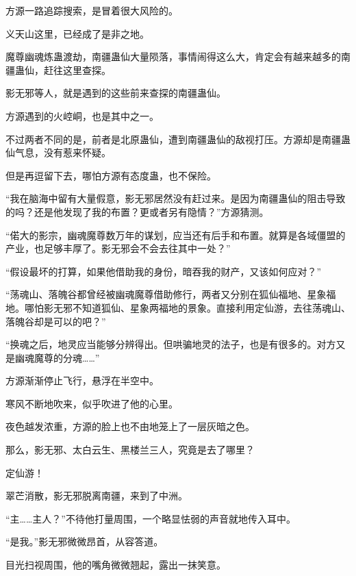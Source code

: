 \begin{this_body}
方源一路追踪搜索，是冒着很大风险的。

义天山这里，已经成了是非之地。

魔尊幽魂炼蛊渡劫，南疆蛊仙大量陨落，事情闹得这么大，肯定会有越来越多的南疆蛊仙，赶往这里查探。

影无邪等人，就是遇到的这些前来查探的南疆蛊仙。

方源遇到的火崆峒，也是其中之一。

不过两者不同的是，前者是北原蛊仙，遭到南疆蛊仙的敌视打压。方源却是南疆蛊仙气息，没有惹来怀疑。

但是再逗留下去，哪怕方源有态度蛊，也不保险。

“我在脑海中留有大量假意，影无邪居然没有赶过来。是因为南疆蛊仙的阻击导致的吗？还是他发现了我的布置？更或者另有隐情？”方源猜测。

“偌大的影宗，幽魂魔尊数万年的谋划，应当还有后手和布置。就算是各域僵盟的产业，也足够丰厚了。影无邪会不会去往其中一处？”

“假设最坏的打算，如果他借助我的身份，暗吞我的财产，又该如何应对？”

“荡魂山、落魄谷都曾经被幽魂魔尊借助修行，两者又分别在狐仙福地、星象福地。哪怕影无邪不知道狐仙、星象两福地的景象。直接利用定仙游，去往荡魂山、落魄谷却是可以的吧？”

“换魂之后，地灵应当能够分辨得出。但哄骗地灵的法子，也是有很多的。对方又是幽魂魔尊的分魂……”

方源渐渐停止飞行，悬浮在半空中。

寒风不断地吹来，似乎吹进了他的心里。

夜色越发浓重，方源的脸上也不由地笼上了一层灰暗之色。

那么，影无邪、太白云生、黑楼兰三人，究竟是去了哪里？

定仙游！

翠芒消散，影无邪脱离南疆，来到了中洲。

“主……主人？”不待他打量周围，一个略显怯弱的声音就地传入耳中。

“是我。”影无邪微微昂首，从容答道。

目光扫视周围，他的嘴角微微翘起，露出一抹笑意。

\end{this_body}

